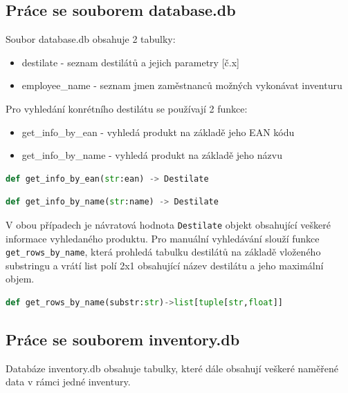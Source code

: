 \subsection{Práce se souborem database.db}
Soubor database.db obsahuje 2 tabulky:
\begin{itemize}
    \item destilate - seznam destilátů a jejich parametry [č.x]
    \item employee\_name - seznam jmen zaměstnanců možných vykonávat inventuru
\end{itemize}
Pro vyhledání konrétního destilátu se používají 2 funkce:
\begin{itemize}
    \item get\_info\_by\_ean - vyhledá produkt na základě jeho EAN kódu
    \item get\_info\_by\_name - vyhledá produkt na základě jeho názvu
\end{itemize}
\begin{lstlisting}[language=Python,breaklines=false, frame=single]
def get_info_by_ean(str:ean) -> Destilate
\end{lstlisting}
\begin{lstlisting}[language=Python,breaklines=false, frame=single]
def get_info_by_name(str:name) -> Destilate
\end{lstlisting}
V obou případech je návratová hodnota \texttt{Destilate} objekt obsahující veškeré informace vyhledaného produktu.
Pro manuální vyhledávání slouží funkce \texttt{get\_rows\_by\_name}, která prohledá tabulku destilátů na základě vloženého substringu a vrátí list polí 2x1 obsahující název destilátu a jeho maximální objem.
\begin{lstlisting}[language=Python,breaklines=false, frame=single]
def get_rows_by_name(substr:str)->list[tuple[str,float]]
\end{lstlisting}

\subsection{Práce se souborem inventory.db}
Databáze inventory.db obsahuje tabulky, které dále obsahují veškeré naměřené data v rámci jedné inventury.

